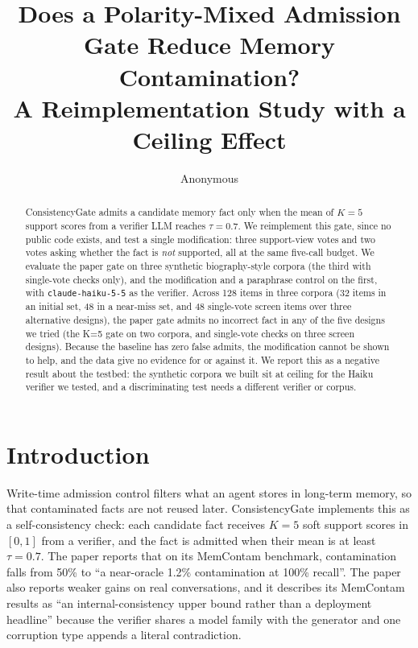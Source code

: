 \documentclass[11pt]{article}
\title{Does a Polarity-Mixed Admission Gate Reduce Memory Contamination?\\A Reimplementation Study with a Ceiling Effect}
\author{Anonymous}
\date{}
\begin{document}
\maketitle

\begin{abstract}
ConsistencyGate \cite{consistencygate} admits a candidate memory fact only when the mean of $K{=}5$ support scores from a verifier LLM reaches $\tau{=}0.7$. We reimplement this gate, since no public code exists, and test a single modification: three support-view votes and two votes asking whether the fact is \emph{not} supported, all at the same five-call budget. We evaluate the paper gate on three synthetic biography-style corpora (the third with single-vote checks only), and the modification and a paraphrase control on the first, with \texttt{claude-haiku-5-5} as the verifier. Across 128 items in three corpora (32 items in an initial set, 48 in a near-miss set, and 48 single-vote screen items over three alternative designs), the paper gate admits no incorrect fact in any of the five designs we tried (the K=5 gate on two corpora, and single-vote checks on three screen designs). Because the baseline has zero false admits, the modification cannot be shown to help, and the data give no evidence for or against it. We report this as a negative result about the testbed: the synthetic corpora we built sit at ceiling for the Haiku verifier we tested, and a discriminating test needs a different verifier or corpus.
\end{abstract}

\section{Introduction}
Write-time admission control filters what an agent stores in long-term memory, so that contaminated facts are not reused later. ConsistencyGate \cite{consistencygate} implements this as a self-consistency check: each candidate fact receives $K{=}5$ soft support scores in $[0,1]$ from a verifier, and the fact is admitted when their mean is at least $\tau{=}0.7$. The paper reports that on its MemContam benchmark, contamination falls from 50\% to ``a near-oracle 1.2\% contamination at 100\% recall''. The paper also reports weaker gains on real conversations, and it describes its MemContam results as ``an internal-consistency upper bound rather than a deployment headline'' because the verifier shares a model family with the generator and one corruption type appends a literal contradiction.
\end{document}
